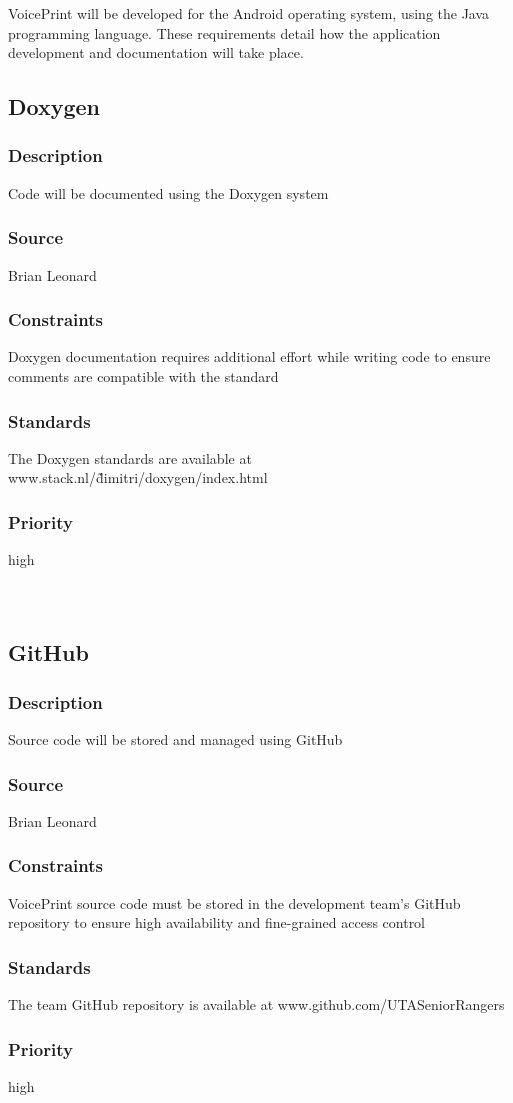 VoicePrint will be developed for the Android operating system, using the Java programming language. These requirements detail how the application development and documentation will take place.

\subsection{Doxygen}
\subsubsection{Description}
Code will be documented using the Doxygen system
\subsubsection{Source}
Brian Leonard
\subsubsection{Constraints}
Doxygen documentation requires additional effort while writing code to ensure comments are compatible with the standard
\subsubsection{Standards}
The Doxygen standards are available at www.stack.nl/\~dimitri/doxygen/index.html \cite{Doxygen}
\subsubsection{Priority}
high\\
\\
\\

\subsection{GitHub}
\subsubsection{Description}
Source code will be stored and managed using GitHub
\subsubsection{Source}
Brian Leonard
\subsubsection{Constraints}
VoicePrint source code must be stored in the development team's GitHub repository to ensure high availability and fine-grained access control
\subsubsection{Standards}
The team GitHub repository is available at www.github.com/UTASeniorRangers \cite{Github}
\subsubsection{Priority}
high